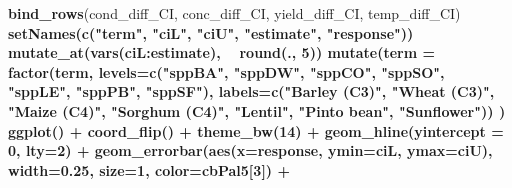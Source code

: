 \documentclass[]{scrartcl}
\newenvironment{Shaded}{\begin{snugshade}}{\end{snugshade}}
\newcommand{\DataTypeTok}[1]{\textcolor[rgb]{0.13,0.29,0.53}{#1}}
\newcommand{\DecValTok}[1]{\textcolor[rgb]{0.00,0.00,0.81}{#1}}
\newcommand{\FloatTok}[1]{\textcolor[rgb]{0.00,0.00,0.81}{#1}}
\newcommand{\KeywordTok}[1]{\textcolor[rgb]{0.13,0.29,0.53}{\textbf{#1}}}
\newcommand{\NormalTok}[1]{#1}
\newcommand{\OperatorTok}[1]{\textcolor[rgb]{0.81,0.36,0.00}{\textbf{#1}}}
\newcommand{\StringTok}[1]{\textcolor[rgb]{0.31,0.60,0.02}{#1}}
\begin{document}
\begin{Shaded}
\begin{Highlighting}[]
{{{{{{{{{{{{  \KeywordTok{bind_rows}\NormalTok{(cond_diff_CI, }
\NormalTok{            conc_diff_CI, }
\NormalTok{            yield_diff_CI, }
\NormalTok{            temp_diff_CI) }\OperatorTok{%
\StringTok{    }\KeywordTok{setNames}\NormalTok{(}\KeywordTok{c}\NormalTok{(}\StringTok{"term"}\NormalTok{, }\StringTok{"ciL"}\NormalTok{, }\StringTok{"ciU"}\NormalTok{,}
               \StringTok{"estimate"}\NormalTok{, }\StringTok{"response"}\NormalTok{))  }\OperatorTok{%
\StringTok{    }\KeywordTok{mutate_at}\NormalTok{(}\KeywordTok{vars}\NormalTok{(ciL}\OperatorTok{:}\NormalTok{estimate), }\OperatorTok{~}\StringTok{ }\KeywordTok{round}\NormalTok{(., }\DecValTok{5}\NormalTok{)) }\OperatorTok{%
\StringTok{    }\KeywordTok{mutate}\NormalTok{(}\DataTypeTok{term =} \KeywordTok{factor}\NormalTok{(term, }
                         \DataTypeTok{levels=}\KeywordTok{c}\NormalTok{(}\StringTok{"sppBA"}\NormalTok{, }\StringTok{"sppDW"}\NormalTok{,}
                                  \StringTok{"sppCO"}\NormalTok{, }\StringTok{"sppSO"}\NormalTok{,}
                                  \StringTok{"sppLE"}\NormalTok{, }\StringTok{"sppPB"}\NormalTok{,}
                                  \StringTok{"sppSF"}\NormalTok{),}
                         \DataTypeTok{labels=}\KeywordTok{c}\NormalTok{(}\StringTok{"Barley (C3)"}\NormalTok{, }
                                  \StringTok{"Wheat (C3)"}\NormalTok{,}
                                  \StringTok{"Maize (C4)"}\NormalTok{, }
                                  \StringTok{"Sorghum (C4)"}\NormalTok{,}
                                  \StringTok{"Lentil"}\NormalTok{, }
                                  \StringTok{"Pinto bean"}\NormalTok{,}
                                  \StringTok{"Sunflower"}\NormalTok{)) )  }\OperatorTok{%
\StringTok{  }\KeywordTok{ggplot}\NormalTok{() }\OperatorTok{+}
\StringTok{    }\KeywordTok{coord_flip}\NormalTok{() }\OperatorTok{+}\StringTok{  }\KeywordTok{theme_bw}\NormalTok{(}\DecValTok{14}\NormalTok{) }\OperatorTok{+}
\StringTok{    }\KeywordTok{geom_hline}\NormalTok{(}\DataTypeTok{yintercept =} \DecValTok{0}\NormalTok{, }\DataTypeTok{lty=}\DecValTok{2}\NormalTok{) }\OperatorTok{+}\StringTok{ }
\StringTok{        }\KeywordTok{geom_errorbar}\NormalTok{(}\KeywordTok{aes}\NormalTok{(}\DataTypeTok{x=}\NormalTok{response,}
                          \DataTypeTok{ymin=}\NormalTok{ciL, }\DataTypeTok{ymax=}\NormalTok{ciU), }
                   \DataTypeTok{width=}\FloatTok{0.25}\NormalTok{, }
                 \DataTypeTok{size=}\DecValTok{1}\NormalTok{, }
                 \DataTypeTok{color=}\NormalTok{cbPal5[}\DecValTok{3}\NormalTok{]) }\OperatorTok{+}
}}}}}}}}}}}}}}}}
\end{Highlighting}
\end{Shaded}
\end{document}
